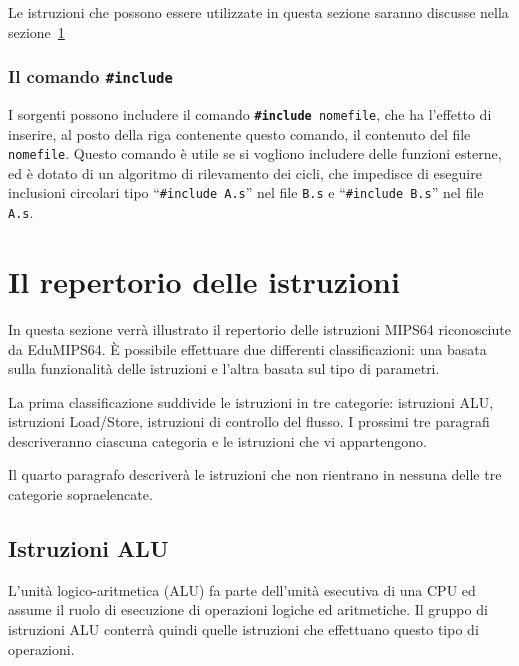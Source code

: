 \documentclass[12pt]{report}
\newcommand{\EM}{EduMIPS64}
\newcommand{\MS}{MIPS64}
\begin{document}

Le istruzioni che possono essere utilizzate in questa sezione saranno discusse nella sezione~\ref{instructions}

\subsection{Il comando \texttt{\#include}}
I sorgenti possono includere il comando \texttt{\textbf{\#include} nomefile}, che
ha l'effetto di inserire, al posto della riga contenente questo comando, il
contenuto del file \texttt{nomefile}.
Questo comando \`e utile se si vogliono includere delle funzioni esterne, ed \`e
dotato di un algoritmo di rilevamento dei cicli, che impedisce di eseguire
inclusioni circolari tipo ``\texttt{\#include A.s}'' nel file \texttt{B.s} e
``\texttt{\#include B.s}'' nel file \texttt{A.s}.

\chapter{Il repertorio delle istruzioni}
\label{instructions}

In questa sezione verr\`{a} illustrato il repertorio delle istruzioni \MS{} riconosciute da \EM{}.
\`{E} possibile effettuare due differenti classificazioni: una basata sulla funzionalit\`{a} delle istruzioni e 
l'altra basata sul tipo di parametri.


La prima classificazione suddivide le istruzioni in tre categorie: istruzioni ALU, istruzioni Load/Store, 
istruzioni di controllo del flusso. I prossimi tre paragrafi descriveranno ciascuna categoria e le istruzioni che vi appartengono.

Il quarto paragrafo descriver\`{a} le istruzioni che non rientrano in nessuna delle tre categorie sopraelencate.


\section{Istruzioni ALU}
L'unit\`{a} logico-aritmetica (ALU) fa parte dell'unit\`{a} esecutiva di una CPU ed assume il ruolo di esecuzione 
di operazioni logiche ed aritmetiche. Il gruppo di istruzioni ALU conterr\`{a} quindi quelle istruzioni 
che effettuano questo tipo di operazioni.
\end{document}
